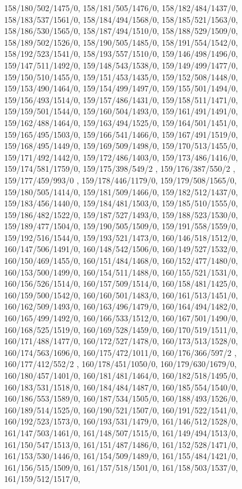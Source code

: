 {158/180/502/1475/0,%
158/181/505/1476/0,%
158/182/484/1437/0,%
158/183/537/1561/0,%
158/184/494/1568/0,%
158/185/521/1563/0,%
158/186/530/1565/0,%
158/187/494/1510/0,%
158/188/529/1509/0,%
158/189/502/1526/0,%
158/190/505/1485/0,%
158/191/554/1542/0,%
158/192/523/1541/0,%
158/193/557/1510/0,%
159/146/498/1496/0,%
159/147/511/1492/0,%
159/148/543/1538/0,%
159/149/499/1477/0,%
159/150/510/1455/0,%
159/151/453/1435/0,%
159/152/508/1448/0,%
159/153/490/1464/0,%
159/154/499/1497/0,%
159/155/501/1494/0,%
159/156/493/1514/0,%
159/157/486/1431/0,%
159/158/511/1471/0,%
159/159/501/1544/0,%
159/160/504/1493/0,%
159/161/491/1491/0,%
159/162/488/1464/0,%
159/163/494/1525/0,%
159/164/501/1451/0,%
159/165/495/1503/0,%
159/166/541/1466/0,%
159/167/491/1519/0,%
159/168/495/1449/0,%
159/169/509/1498/0,%
159/170/513/1455/0,%
159/171/492/1442/0,%
159/172/486/1403/0,%
159/173/486/1416/0,%
159/174/581/1759/0,%
159/175/398/549/2 ,%
159/176/387/550/2 ,%
159/177/459/993/0 ,%
159/178/446/1179/0,%
159/179/508/1565/0,%
159/180/505/1414/0,%
159/181/509/1466/0,%
159/182/512/1437/0,%
159/183/456/1440/0,%
159/184/481/1503/0,%
159/185/510/1555/0,%
159/186/482/1522/0,%
159/187/527/1493/0,%
159/188/523/1530/0,%
159/189/477/1504/0,%
159/190/505/1509/0,%
159/191/558/1559/0,%
159/192/516/1544/0,%
159/193/521/1473/0,%
160/146/518/1512/0,%
160/147/506/1491/0,%
160/148/542/1506/0,%
160/149/527/1532/0,%
160/150/469/1455/0,%
160/151/484/1468/0,%
160/152/477/1480/0,%
160/153/500/1499/0,%
160/154/511/1488/0,%
160/155/521/1531/0,%
160/156/526/1514/0,%
160/157/509/1514/0,%
160/158/481/1425/0,%
160/159/500/1542/0,%
160/160/501/1483/0,%
160/161/513/1451/0,%
160/162/509/1493/0,%
160/163/496/1479/0,%
160/164/494/1482/0,%
160/165/499/1492/0,%
160/166/533/1512/0,%
160/167/501/1490/0,%
160/168/525/1519/0,%
160/169/528/1459/0,%
160/170/519/1511/0,%
160/171/488/1477/0,%
160/172/527/1478/0,%
160/173/513/1528/0,%
160/174/563/1696/0,%
160/175/472/1011/0,%
160/176/366/597/2 ,%
160/177/412/552/2 ,%
160/178/451/1050/0,%
160/179/630/1679/0,%
160/180/457/1401/0,%
160/181/481/1464/0,%
160/182/518/1495/0,%
160/183/531/1518/0,%
160/184/484/1487/0,%
160/185/554/1540/0,%
160/186/553/1589/0,%
160/187/534/1505/0,%
160/188/493/1526/0,%
160/189/514/1525/0,%
160/190/521/1507/0,%
160/191/522/1541/0,%
160/192/523/1573/0,%
160/193/531/1479/0,%
161/146/512/1528/0,%
161/147/503/1461/0,%
161/148/507/1515/0,%
161/149/494/1513/0,%
161/150/547/1513/0,%
161/151/487/1486/0,%
161/152/528/1471/0,%
161/153/530/1446/0,%
161/154/509/1489/0,%
161/155/484/1421/0,%
161/156/515/1509/0,%
161/157/518/1501/0,%
161/158/503/1537/0,%
161/159/512/1517/0,%
}
